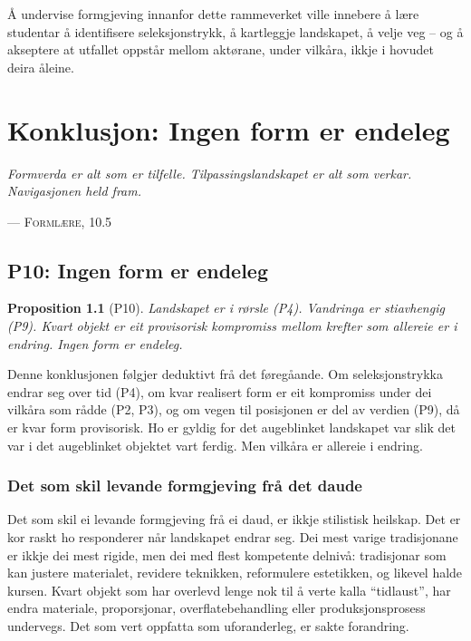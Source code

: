 \documentclass[12pt,a4paper,oneside]{report}
\newtheorem{proposition}[theorem]{Proposition}
\begin{document}
Å undervise formgjeving innanfor dette rammeverket ville innebere å lære studentar å identifisere seleksjonstrykk, å kartleggje landskapet, å velje veg -- og å akseptere at utfallet oppstår mellom aktørane, under vilkåra, ikkje i hovudet deira åleine.

\chapter{Konklusjon: Ingen form er endeleg}
\label{ch:konklusjon}

\epigraph{\itshape Formverda er alt som er tilfelle. Tilpassingslandskapet er alt som verkar. Navigasjonen held fram.}{--- \textsc{Formlære}, 10.5}

\section{P10: Ingen form er endeleg}

\begin{proposition}[P10]
Landskapet er i rørsle (P4). Vandringa er stiavhengig (P9). Kvart objekt er eit provisorisk kompromiss mellom krefter som allereie er i endring. Ingen form er endeleg.
\end{proposition}

Denne konklusjonen følgjer deduktivt frå det føregåande. Om seleksjonstrykka endrar seg over tid (P4), om kvar realisert form er eit kompromiss under dei vilkåra som rådde (P2, P3), og om vegen til posisjonen er del av verdien (P9), då er kvar form provisorisk. Ho er gyldig for det augeblinket landskapet var slik det var i det augeblinket objektet vart ferdig. Men vilkåra er allereie i endring.

\subsection{Det som skil levande formgjeving frå det daude}

Det som skil ei levande formgjeving frå ei daud, er ikkje stilistisk heilskap. Det er kor raskt ho responderer når landskapet endrar seg. Dei mest varige tradisjonane er ikkje dei mest rigide, men dei med flest kompetente delnivå: tradisjonar som kan justere materialet, revidere teknikken, reformulere estetikken, og likevel halde kursen. Kvart objekt som har overlevd lenge nok til å verte kalla ``tidlaust'', har endra materiale, proporsjonar, overflatebehandling eller produksjonsprosess undervegs. Det som vert oppfatta som uforanderleg, er sakte forandring.
\end{document}
